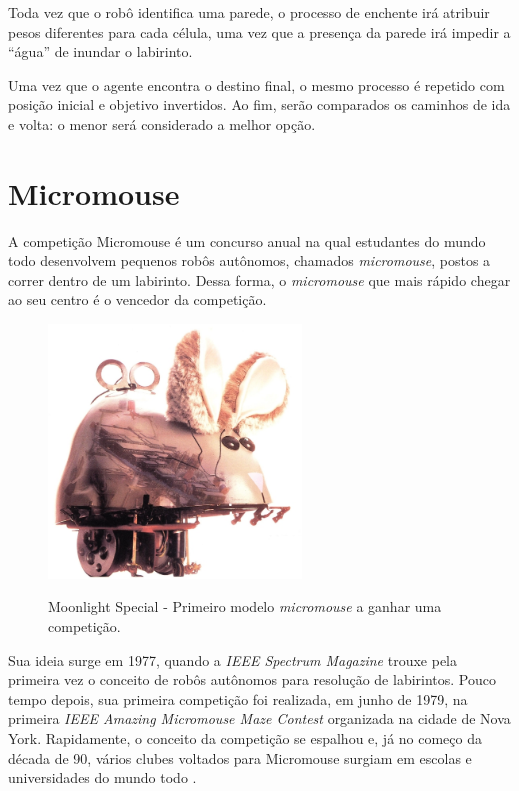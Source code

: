 Toda vez que o robô identifica uma parede, o processo de enchente irá atribuir pesos diferentes para cada célula, uma vez que a presença da parede irá impedir a “água” de inundar o labirinto.

Uma vez que o agente encontra o destino final, o mesmo processo é repetido com posição inicial e objetivo invertidos. Ao fim, serão comparados os caminhos de ida e volta: o menor será considerado a melhor opção.

\section{Micromouse}
\label{sec:Micromouse}
\hspace{0.5cm} A competição Micromouse é um concurso anual na qual estudantes do mundo todo desenvolvem pequenos robôs autônomos, chamados \textit{micromouse}, postos a correr dentro de um labirinto. Dessa forma, o \textit{micromouse} que mais rápido chegar ao seu centro é o vencedor da competição\cite{ROSbot}.

\begin{figure}[H]
	\centering
	\caption{Moonlight Special - Primeiro modelo \textit{micromouse} a ganhar uma competição.}
	\includegraphics[width=0.6\textwidth]
	{Figures/MoonlightSpecial.jpg}
	\label{fig:MoonlightSpecial}
\end{figure}

\hspace{0.5cm} Sua ideia surge em 1977, quando a \textit{IEEE Spectrum Magazine} trouxe pela primeira vez o conceito de robôs autônomos para resolução de labirintos. Pouco tempo depois, sua primeira competição foi realizada, em junho de 1979, na primeira \textit{IEEE Amazing Micromouse Maze Contest} organizada na cidade de Nova York. Rapidamente, o conceito da competição se espalhou e, já no começo da década de 90, vários clubes voltados para Micromouse surgiam em escolas e universidades do mundo todo \cite{Tondr2004}.

